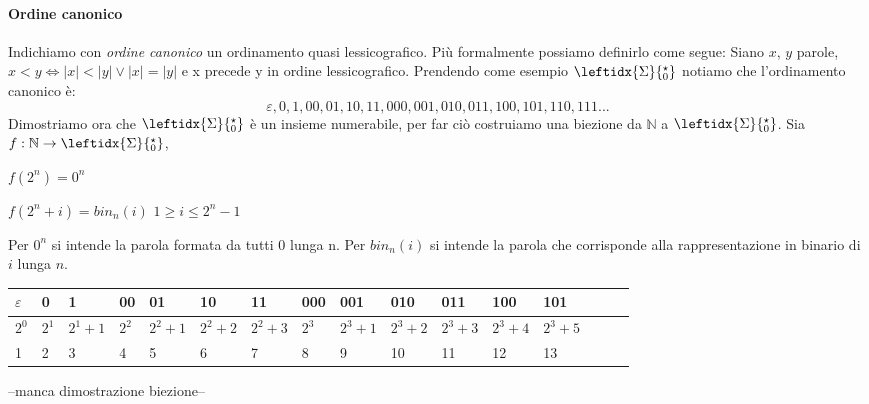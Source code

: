 \paragraph{Ordine canonico} Indichiamo con \emph{ordine canonico} un ordinamento quasi lessicografico. Pi\`u formalmente possiamo definirlo come segue: \newline
Siano $x$, $y$ parole, $x < y \Leftrightarrow |x| < |y| \lor  |x| = |y|$ e x precede y in ordine lessicografico.\newline
Prendendo come esempio $\leftidx{\Sigma}{_0^{\star}}$ notiamo che l'ordinamento canonico \`e: 
\[
	\varepsilon, 0, 1, 00, 01, 10, 11, 000, 001, 010, 011, 100, 101, 110, 111 ...
\]
Dimostriamo ora che $\leftidx{\Sigma}{_0^{\star}}$ \`e un insieme numerabile, per far ci\`o costruiamo una biezione da $\mathbb{N}$ a $\leftidx{\Sigma}{_0^{\star}}$. \newline
Sia $f :  \mathbb{N} \to \leftidx{\Sigma}{_0^{\star}}$, 
\begin{description}
	\item $f(2^n) = 0^n$ 
	\item $f(2^n + i) = bin_n(i)$ $1 \geq i \leq 2^n-1$
\end{description}
Per $0^n$ si intende la parola formata da tutti $0$ lunga n.\newline
Per $bin_n(i)$ si intende la parola che corrisponde alla rappresentazione in binario di $i$ lunga $n$.\newline
\begin{tabular}{|l|l|l|l|l|l|l|l|l|l|l|l|l|l|l|l|}
\hline
$\varepsilon$ & 0 & 1 & 00 & 01 & 10 & 11 & 000 & 001 & 010 & 011 & 100 & 101\\
\hline
$2^0$ & $2^1$ & $2^1+1$ & $2^2$ & $2^2+1$ & $2^2+2$ & $2^2+3$ & $2^3$ & $2^3+1$ & $2^3+2$ & $2^3+3$ & $2^3+4$ & $2^3+5$\\
\hline
1 & 2 & 3 & 4 & 5 & 6 & 7 & 8 & 9 & 10 & 11 & 12 & 13\\
\hline
\end{tabular}
\newline
--manca dimostrazione biezione--
